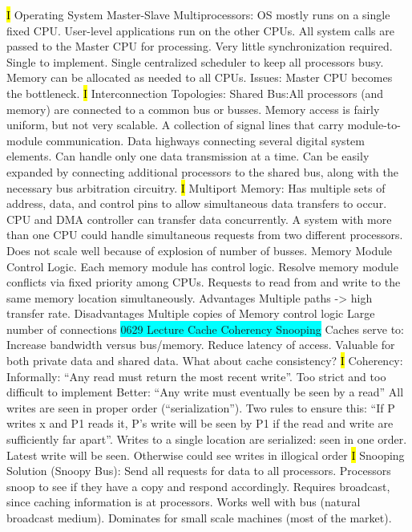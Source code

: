 \documentclass[fontsize=4pt]{scrartcl}
\begin{document}
\hl{I}
Operating System Master-Slave Multiprocessors: OS mostly runs on a single fixed CPU. User-level applications run on the other CPUs. All system calls are passed to the Master CPU for processing. Very little synchronization required. Single to implement. Single centralized scheduler to keep all processors busy. Memory can be allocated as needed to all CPUs. Issues: Master CPU becomes the bottleneck.
\hl{I} 
Interconnection Topologies: Shared Bus:All processors (and memory) are connected to a  common bus or busses. Memory access is fairly uniform, but not very scalable. A collection of signal lines that carry module-to-module communication. Data highways connecting several digital system elements. Can handle only one data transmission at a time. Can be easily expanded by connecting additional processors to the shared bus, along with the necessary bus arbitration circuitry.
\hl{I}
Multiport Memory: Has multiple sets of address, data, and control pins to allow simultaneous data transfers to occur. CPU and DMA controller can transfer data concurrently. A system with more than one CPU could handle simultaneous requests from two different processors. Does not scale well because of explosion of number of busses. Memory Module Control Logic. Each memory module has control logic. Resolve memory module conflicts via fixed priority among CPUs. Requests to read from and write to the same memory location simultaneously. Advantages Multiple paths -> high transfer rate. Disadvantages Multiple copies of Memory control logic Large number of connections
\colorbox{Cyan}{0629 Lecture Cache Coherency Snooping} Caches serve to: Increase bandwidth versus bus/memory. Reduce latency of access. Valuable for both private data and shared data. What about cache consistency?
\hl{I}
Coherency: Informally: “Any read must return the most recent write”. Too strict and too difficult to implement Better: “Any write must eventually be seen by a read” All writes are seen in proper order (“serialization”). Two rules to ensure this: “If P writes x and P1 reads it, P’s write will be seen by P1 if the read and write are sufficiently far apart”. Writes to a single location are serialized: seen in one order. Latest write will be seen. Otherwise could see writes in illogical order
\hl{I}
Snooping Solution (Snoopy Bus): Send all requests for data to all processors. Processors snoop to see if they have a copy and respond accordingly. Requires broadcast, since caching information is at processors. Works well with bus (natural broadcast medium). Dominates for small scale machines (most of the market).
\end{document}
